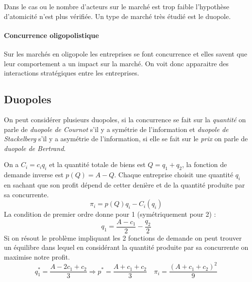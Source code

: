 Dans le cas ou le nombre d'acteurs sur le marché est trop faible l'hypothèse d'atomicité n'est plus vérifiée. Un type de marché très étudié est le duopole. 

\paragraph{Concurrence oligopolistique} %
\label{par:concurrence_oligopolistique}
 Sur les marchés en oligopole les entreprises se font concurrence et elles savent que leur comportement a un impact sur la marché. On voit donc apparaitre des interactions stratégiques entre les entreprises.

\subsection{Duopoles} %
\label{sub:duopoles}

On peut considérer plusieurs duopoles, si la concurrence se fait sur la \emph{quantité} 
on parle de \emph{duopole de Cournot} s'il y a symétrie de l'information
et \emph{duopole de Stackelberg} s'il y a asymétrie de l'information, 
si elle se fait sur le \emph{prix} on parle de \emph{duopole de Bertrand}.

\begin{tcolorbox}[title=Duopole de Cournot]
	
	On a $C_i=c_iq_i$ et la quantité totale de biens est $Q=q_1+q_2$, la fonction de demande inverse est $p(Q)=A-Q$.
	Chaque entreprise choisit une quantité $q_i$ en sachant que son profit dépend de cetter denière et de la quantité produite par sa concurrente.
	\[
		\pi_i = p(Q)q_i-C_i(q_i)
	\]
	La condition de premier ordre donne pour 1 (symétriquement pour 2) :
	\[
		q_1 = \frac{A-c_1}{2}-\frac{q_2}{2}
	\]
	Si on résout le problème impliquant les 2 fonctions de demande on peut trouver un équilibre dans lequel en considérant la quantité produite par sa concurrente on maximise notre profit.
	\[
		q_1^* = \frac{A-2c_1+c_2}{3} \Rightarrow p^* = \frac{A+c_1+c_2}{3} \quad \pi_i= \frac{(A+c_1+c_2)^2}{9}
	\]
	
\end{tcolorbox}

